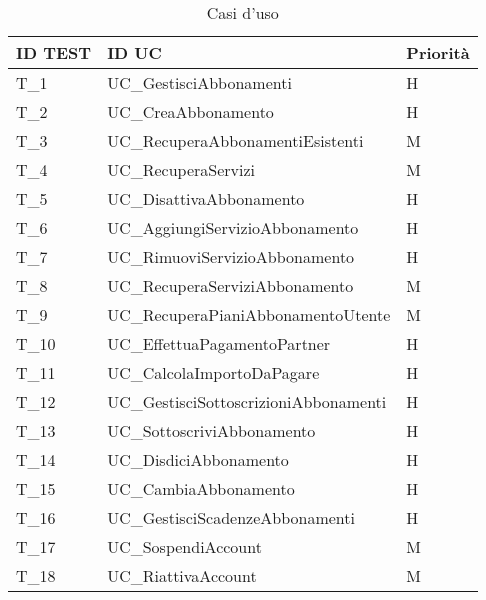 \begin{longtable}{| p{} | p{} | p{} |}
    \caption{Casi d'uso}                                                         \\
    \hline
    \textbf{ID TEST} & \textbf{ID UC}                        & \textbf{Priorità} \\\hline
    T\_1             & UC\_GestisciAbbonamenti               & H                 \\\hline
    T\_2             & UC\_CreaAbbonamento                   & H                 \\\hline
    T\_3             & UC\_RecuperaAbbonamentiEsistenti      & M                 \\\hline
    T\_4             & UC\_RecuperaServizi                   & M                 \\\hline
    T\_5             & UC\_DisattivaAbbonamento              & H                 \\\hline
    T\_6             & UC\_AggiungiServizioAbbonamento       & H                 \\\hline
    T\_7             & UC\_RimuoviServizioAbbonamento        & H                 \\\hline
    T\_8             & UC\_RecuperaServiziAbbonamento        & M                 \\\hline
    T\_9             & UC\_RecuperaPianiAbbonamentoUtente    & M                 \\\hline
    T\_10            & UC\_EffettuaPagamentoPartner          & H                 \\\hline
    T\_11            & UC\_CalcolaImportoDaPagare            & H                 \\\hline
    T\_12            & UC\_GestisciSottoscrizioniAbbonamenti & H                 \\\hline
    T\_13            & UC\_SottoscriviAbbonamento            & H                 \\\hline
    T\_14            & UC\_DisdiciAbbonamento                & H                 \\\hline
    T\_15            & UC\_CambiaAbbonamento                 & H                 \\\hline
    T\_16            & UC\_GestisciScadenzeAbbonamenti       & H                 \\\hline
    T\_17            & UC\_SospendiAccount                   & M                 \\\hline
    T\_18            & UC\_RiattivaAccount                   & M                 \\\hline

\end{longtable}

